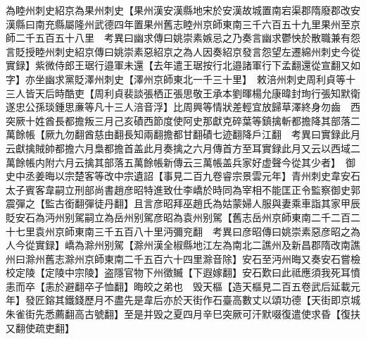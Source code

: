 為睦州刺史紹京為果州刺史【果州漢安漢縣地宋於安漢故城置南宕渠郡隋廢郡改安漢縣曰南充縣屬隆州武德四年置果州舊志睦州京師東南三千六百五十九里果州至京師二千五百五十八里　考異曰幽求傳曰姚崇素嫉忌之乃奏言幽求鬱怏於散職兼有怨言貶授睦州刺史紹京傳曰姚崇素惡紹京之為人因奏紹京發言怨望左遷綿州刺史今從實録】紫微侍郎王琚行邉軍未還【去年遣王琚按行北邉諸軍行下孟翻還從宣翻又如字】亦坐幽求黨貶澤州刺史【澤州京師東北一千三十里】　敕涪州刺史周利貞等十三人皆天后時酷吏【周利貞裴談張栖正張思敬王承本劉暉楊允康暐封珣行張知默衛遂忠公孫琰鍾思亷等凡十三人涪音浮】比周興等情狀差輕宜放歸草澤終身勿齒　西突厥十姓酋長都擔叛三月己亥磧西節度使阿史那獻克碎葉等鎮擒斬都擔降其部落二萬餘帳【厥九勿翻酋慈由翻長知兩翻擔都甘翻磧七迹翻降戶江翻　考異曰實録此月云獻擒賊帥都擔六月梟都擔首盖此月奏擒之六月傳首方至耳實録此月又云以西域二萬餘帳内附六月云擒其部落五萬餘帳新傳云三萬帳盖兵家好虚聲今從其少者】　御史中丞姜晦以宗楚客等改中宗遺詔【事見二百九卷睿宗景雲元年】青州刺史韋安石太子賓客韋嗣立刑部尚書趙彦昭特進致仕李嶠於時同為宰相不能匡正令監察御史郭震彈之【監古銜翻彈徒丹翻】且言彦昭拜巫趙氏為姑蒙婦人服與妻乘車詣其家甲辰貶安石為沔州别駕嗣立為岳州别駕彦昭為袁州别駕【舊志岳州京師東南二千二百二十七里袁州京師東南三千五百八十里沔彌兖翻　考異曰彦昭傳曰姚崇素惡彦昭之為人今從實録】嶠為滁州别駕【滁州漢全椒縣地江左為南北二譙州及新昌郡隋改南譙州曰滁州舊志滁州京師東南二千五百六十四里滁音除】安石至沔州晦又奏安石嘗檢校定陵【定陵中宗陵】盗隱官物下州徵贓【下遐嫁翻】安石歎曰此祗應須我死耳憤恚而卒【恚於避翻卒子恤翻】晦皎之弟也　毁天樞【造天樞見二百五卷武后延載元年】發匠鎔其鐵錢歷月不盡先是韋后亦於天街作石臺高數丈以頌功德【天街即京城朱雀街先悉薦翻高古號翻】至是并毁之夏四月辛巳突厥可汗默啜復遣使求昏【復扶又翻使疏吏翻】

